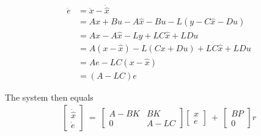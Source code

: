 \begin{align*}
\dot{e}     &= \dot{x} - \dot{\hat{x}}\\
            &= Ax+Bu-A\hat{x}-Bu-L(y-C\hat{x}-Du)\\
            &= Ax - A\hat{x} -Ly + LC\hat{x} + LDu\\
            &= A(x -\hat{x})- L(Cx + Du) + LC\hat{x} + LDu\\
            &= Ae - LC(x - \hat{x})\\
            &= (A - LC)e
\end{align*}
\begin{comment}
When {A,C} is observable an appropriate observer gain L can be chosen by assigning the eigenvalues of A − LC to achieve a certain convergence rate for e.
\end{comment}

The system then equals
\begin{align*}
\begin{bmatrix}
    \dot{\hat{x}}\\
    \dot{e}
\end{bmatrix}\ = \
\begin{bmatrix}
    A-BK     &   BK\\
    0        &   A-LC
\end{bmatrix}
\begin{bmatrix}
    x\\
    e
\end{bmatrix}\ + \
\begin{bmatrix}
    BP\\
    0
\end{bmatrix}r
\end{align*}

\newpage
{}
